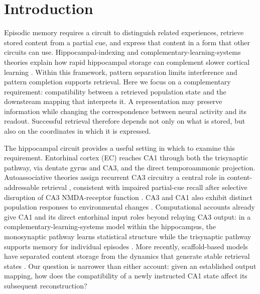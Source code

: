 \section{Introduction}

Episodic memory requires a circuit to distinguish related experiences, retrieve
stored content from a partial cue, and express that content in a form that
other circuits can use. Hippocampal-indexing and complementary-learning-systems
theories explain how rapid hippocampal storage can complement slower cortical
learning \citep{teyler1986,mcclelland1995}. Within this framework, pattern
separation limits interference and pattern completion supports retrieval.
Here we focus on a complementary requirement: compatibility between a
retrieved population state and the downstream mapping that interprets it.
A representation may preserve information while changing the correspondence
between neural activity and its readout. Successful retrieval therefore
depends not only on what is stored, but also on the coordinates in which it
is expressed.

The hippocampal circuit provides a useful setting in which to examine this
requirement. Entorhinal cortex (EC) reaches CA1 through both the trisynaptic
pathway, via dentate gyrus and CA3, and the direct temporoammonic projection.
Autoassociative theories assign recurrent CA3 circuitry a central role in
content-addressable retrieval \citep{marr1971}, consistent with impaired
partial-cue recall after selective disruption of CA3 NMDA-receptor function
\citep{nakazawa2002}. CA3 and CA1 also exhibit distinct population responses
to environmental changes \citep{leutgeb2004}. Computational accounts already
give CA1 and its direct entorhinal input roles beyond relaying CA3 output:
in a complementary-learning-systems model within the hippocampus, the
monosynaptic pathway learns statistical structure while the trisynaptic
pathway supports memory for individual episodes \citep{schapiro2017}.
More recently, scaffold-based models have separated content storage from the
dynamics that generate stable retrieval states \citep{chandra2025}.
Our question is narrower than either account: given an established output
mapping, how does the compatibility of a newly instructed CA1 state affect
its subsequent reconstruction?

